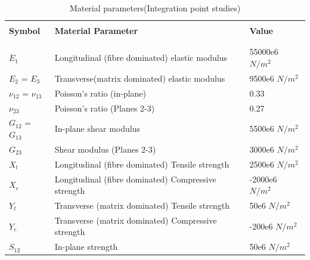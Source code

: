 \documentclass[a4paper,12pt]{extarticle}
\begin{document}
\begin{table}
  \begin{center}
     \begin{tabular}{l l l} 
     \hline
     \\
      \textbf{Symbol} \;\;& \textbf{Material Parameter} \;& \textbf{Value}\\
      \\
      \hline
      \\
      \vspace*{0.1cm}
      $E_{1}$ & Longitudinal (fibre dominated) elastic modulus &  55000e6 $N/m^{2}$\\
      \vspace*{0.1cm}
      $E_{2}$ = $E_{3}$  & Transverse(matrix dominated) elastic modulus   & 9500e6 $N/m^{2}$ \\
      \vspace*{0.1cm}
      $\nu_{12}$ = $\nu_{13}$  & Poisson's ratio (in-plane)  & 0.33 \\
      \vspace*{0.1cm}
      $\nu_{23}$   & Poisson's ratio (Planes 2-3)  & 0.27 \\
      \vspace*{0.1cm}
      $G_{12}$ = $G_{13}$  & In-plane shear modulus  & 5500e6 $N/m^{2}$ \\
      \vspace*{0.1cm}
      $G_{23}$   & Shear modulus (Planes 2-3)   & 3000e6 $N/m^{2}$ \\
      \vspace*{0.1cm}
      $X_{t}$ & Longitudinal (fibre dominated) Tensile strength &  2500e6 $N/m^{2}$\\
      \vspace*{0.1cm}
      $X_{c}$ & Longitudinal (fibre dominated) Compressive strength &  -2000e6 $N/m^{2}$\\
      \vspace*{0.1cm}
      $Y_{t}$ & Transverse (matrix dominated) Tensile strength &  50e6 $N/m^{2}$\\
      \vspace*{0.1cm}
      $Y_{c}$ & Transverse (matrix dominated) Compressive strength &  -200e6 $N/m^{2}$\\
      \vspace*{0.1cm}
      $S_{12}$ & In-plane strength &  50e6 $N/m^{2}$\\

       \hline
    \end{tabular}
    \\
    \caption{Material parameters(Integration point studies)}
    \label{tab:Material parameters(Integration point studies}
  \end{center}
\end{table}
\end{document}
